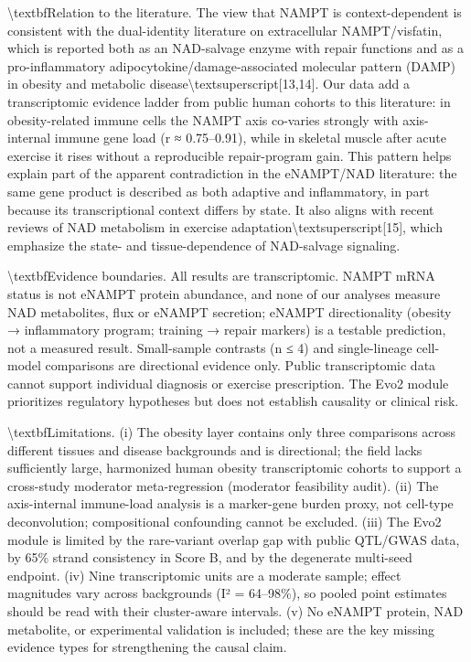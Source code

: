 \documentclass[11pt]{article}
\begin{document}
\textbackslash{}textbf{Relation to the literature.} The view that NAMPT is context-dependent is consistent with the dual-identity literature on extracellular NAMPT/visfatin, which is reported both as an NAD-salvage enzyme with repair functions and as a pro-inflammatory adipocytokine/damage-associated molecular pattern (DAMP) in obesity and metabolic disease\textbackslash{}textsuperscript{[13,14]}. Our data add a transcriptomic evidence ladder from public human cohorts to this literature: in obesity-related immune cells the NAMPT axis co-varies strongly with axis-internal immune gene load (r ≈ 0.75–0.91), while in skeletal muscle after acute exercise it rises without a reproducible repair-program gain. This pattern helps explain part of the apparent contradiction in the eNAMPT/NAD literature: the same gene product is described as both adaptive and inflammatory, in part because its transcriptional context differs by state. It also aligns with recent reviews of NAD metabolism in exercise adaptation\textbackslash{}textsuperscript{[15]}, which emphasize the state- and tissue-dependence of NAD-salvage signaling.

\textbackslash{}textbf{Evidence boundaries.} All results are transcriptomic. NAMPT mRNA status is not eNAMPT protein abundance, and none of our analyses measure NAD metabolites, flux or eNAMPT secretion; eNAMPT directionality (obesity → inflammatory program; training → repair markers) is a testable prediction, not a measured result. Small-sample contrasts (n ≤ 4) and single-lineage cell-model comparisons are directional evidence only. Public transcriptomic data cannot support individual diagnosis or exercise prescription. The Evo2 module prioritizes regulatory hypotheses but does not establish causality or clinical risk.

\textbackslash{}textbf{Limitations.} (i) The obesity layer contains only three comparisons across different tissues and disease backgrounds and is directional; the field lacks sufficiently large, harmonized human obesity transcriptomic cohorts to support a cross-study moderator meta-regression (moderator feasibility audit). (ii) The axis-internal immune-load analysis is a marker-gene burden proxy, not cell-type deconvolution; compositional confounding cannot be excluded. (iii) The Evo2 module is limited by the rare-variant overlap gap with public QTL/GWAS data, by 65\% strand consistency in Score B, and by the degenerate multi-seed endpoint. (iv) Nine transcriptomic units are a moderate sample; effect magnitudes vary across backgrounds (I² = 64–98\%), so pooled point estimates should be read with their cluster-aware intervals. (v) No eNAMPT protein, NAD metabolite, or experimental validation is included; these are the key missing evidence types for strengthening the causal claim.
\end{document}
